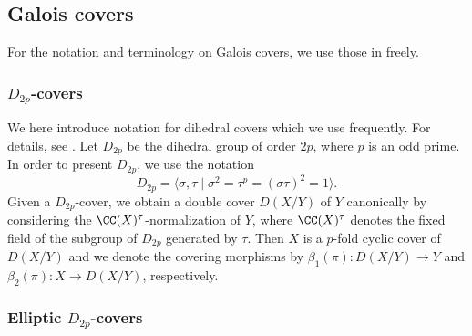 
%
%



\subsection{Galois covers}

For the notation and terminology  on Galois covers, we use those in \cite{act, bannai-tokunaga, tokunaga94} freely.

\subsubsection{$D_{2p}$-covers}

We here introduce notation for dihedral covers which we use frequently. For details, see \cite{tokunaga94}.
Let $D_{2p}$ be the dihedral group of order $2p$, where $p$ is an  odd prime. 
 In order to present $D_{2p}$, we use
 the notation
 \[
 D_{2p} = \langle \sigma, \tau \mid \sigma^2 = \tau^p = (\sigma\tau)^2 = 1\rangle.
 \]
 Given a $D_{2p}$-cover, we obtain a double cover $D(X/Y)$ of $Y$ canonically by considering the
 $\CC(X)^{\tau}$-normalization of $Y$, where $\CC(X)^{\tau}$ denotes the fixed field 
 of the subgroup of $D_{2p}$ generated by $\tau$.  Then $X$ is a $p$-fold cyclic cover of $D(X/Y)$ and
 we denote the covering morphisms by
 $\beta_1(\pi) : D(X/Y) \to Y$ and $\beta_2(\pi) : X \to D(X/Y)$, respectively.  

\subsubsection{Elliptic $D_{2p}$-covers}

